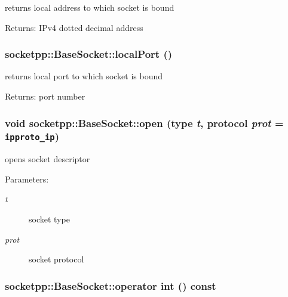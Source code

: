 \begin{CompactItemize}
returns local address to which socket is bound 

\begin{Desc}
\item[Returns:]IPv4 dotted decimal address \end{Desc}
\hypertarget{classsocketpp_1_1BaseSocket_d4a2c0e4932436ef61f911514385d16c}{
\subsubsection[{localPort}]{ socketpp::BaseSocket::localPort ()}}
\label{classsocketpp_1_1BaseSocket_d4a2c0e4932436ef61f911514385d16c}


returns local port to which socket is bound 

\begin{Desc}
\item[Returns:]port number \end{Desc}
\hypertarget{classsocketpp_1_1BaseSocket_2060dc1b648f83f8bf5ae3d9ecfcd619}{
\subsubsection[{open}]{\setlength{\rightskip}{0pt plus 5cm}void socketpp::BaseSocket::open ({\bf type} {\em t}, \/  {\bf protocol} {\em prot} = {\tt ipproto\_\-ip})}}
\label{classsocketpp_1_1BaseSocket_2060dc1b648f83f8bf5ae3d9ecfcd619}


opens socket descriptor 

\begin{Desc}
\item[Parameters:]
\begin{description}
\item[{\em t}]socket type \item[{\em prot}]socket protocol \end{description}
\end{Desc}
\hypertarget{classsocketpp_1_1BaseSocket_fa397f810462fe61238dbbf2d9c42c90}{
\subsubsection[{operator int}]{\setlength{\rightskip}{0pt plus 5cm}socketpp::BaseSocket::operator int () const}}
\label{classsocketpp_1_1BaseSocket_fa397f810462fe61238dbbf2d9c42c90}



\end{CompactItemize}
